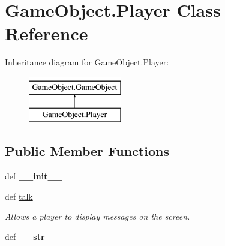 \hypertarget{classGameObject_1_1Player}{\section{\-Game\-Object.\-Player \-Class \-Reference}
\label{classGameObject_1_1Player}
}
\-Inheritance diagram for \-Game\-Object.\-Player\-:\begin{figure}[H]
\begin{center}
\leavevmode
\includegraphics[height=2.000000cm]{classGameObject_1_1Player}
\end{center}
\end{figure}
\subsection*{\-Public \-Member \-Functions}
\begin{DoxyCompactItemize}
\item 
\hypertarget{classGameObject_1_1Player_ad0b7880d20e8c219e9fd47014103dd3b}{def {\bfseries \-\_\-\-\_\-init\-\_\-\-\_\-}}\label{classGameObject_1_1Player_ad0b7880d20e8c219e9fd47014103dd3b}

\item 
\hypertarget{classGameObject_1_1Player_a580484c70e54b3d6b4da4e52cb102c5c}{def \hyperlink{classGameObject_1_1Player_a580484c70e54b3d6b4da4e52cb102c5c}{talk}}\label{classGameObject_1_1Player_a580484c70e54b3d6b4da4e52cb102c5c}

\begin{DoxyCompactList}\small\item\em \-Allows a player to display messages on the screen. \end{DoxyCompactList}\item 
\hypertarget{classGameObject_1_1Player_a96ec26d510c53ca7e61aede58f6066da}{def {\bfseries \-\_\-\-\_\-str\-\_\-\-\_\-}}\label{classGameObject_1_1Player_a96ec26d510c53ca7e61aede58f6066da}

\end{DoxyCompactItemize}
